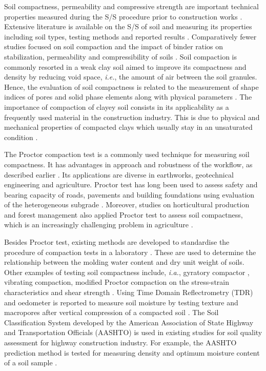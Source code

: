 \documentclass{amestyle}
\begin{document}
Soil compactness, permeability and compressive strength are important technical properties measured during the S/S procedure prior to construction works \cite{LindhWinter,XU2021114774}. Extensive literature is available on the S/S of soil and measuring its properties including soil types, testing methods and reported results \cite{Anagnostopoulos,Kallenetal2016,Lemenkov2021a,HUANG2022115452}. Comparatively fewer studies focused on soil compaction and the impact of binder ratios on stabilization, permeability and compressibility of soils \cite{Kongkitkul,Leeetal2007}. Soil compaction is commonly resorted in a weak clay soil aimed to improve its compactness and density by reducing void space, \emph{i.e.}, the amount of air between the soil granules. Hence, the evaluation of soil compactness is related to the measurement of shape indices of pores and solid phase elements along with physical parameters \cite{Bryk}. The importance of compaction of clayey soil consists in its applicability as a frequently used material in the construction industry. This is due to physical and mechanical properties of compacted clays which usually stay in an unsaturated condition \cite{Zou}. 

The Proctor compaction test is a commonly used technique for measuring soil compactness. It has advantages in approach and robustness of the workflow, as described earlier \cite{Wasman,Matteo,Boudlal}. Its applications are diverse in earthworks, geotechnical engineering and agriculture. Proctor test has long been used to assess safety and bearing capacity of roads, pavements and building foundations using evaluation of the heterogeneous subgrade \cite{Barden,Jibon}. Moreover, studies on horticultural production and forest management also applied Proctor test to assess soil compactness, which is an increasingly challenging problem in agriculture \cite{ARAGON2000197,Bayat,Nhantumbo,ALAOUI20111}. 

Besides Proctor test, existing methods are developed to standardise the procedure of compaction tests in a laboratory \cite{ASTM2007,ASTM2009}. These are used to determine the relationship between the molding water content and dry unit weight of soils. Other examples of testing soil compactness include, \emph{i.a.}, gyratory compactor \cite{Leeetal2007}, vibrating compaction, modified Proctor compaction on the stress-strain characteristics and shear strength \cite{Long}. Using Time Domain Reflectrometry (TDR) and oedometer is reported to measure soil moisture by testing texture and macropores after vertical compression of a compacted soil \cite{Alaoui}. The Soil Classification System developed by the American Association of State Highway and Transportation Officials (AASHTO) is used in existing studies for soil quality assessment for highway construction industry. For example, the AASHTO prediction method is tested for measuring density and optimum moisture content of a soil sample \cite{Livneh}. 
\end{document}
